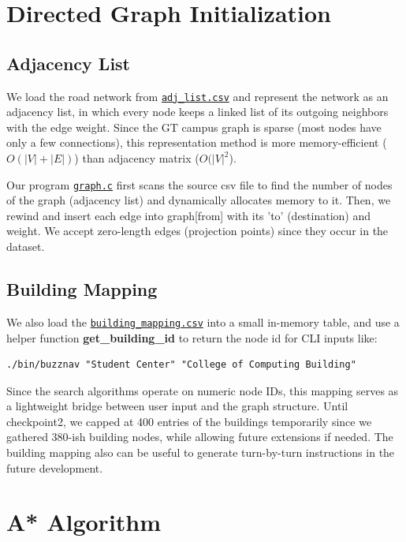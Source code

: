 \documentclass[fleqn,10pt]{olplainarticle}
\begin{document}
\section*{Directed Graph Initialization}
\subsection*{Adjacency List}
We load the road network from \href{https://github.com/fredkyang/cse6010-buzznav/blob/main/data/adj_list.csv}{\texttt{adj\_list.csv}} and represent the network as an adjacency list, in which every node keeps a linked list of its outgoing neighbors with the edge weight. Since the GT campus graph is sparse (most nodes have only a few connections), this representation method is more memory-efficient ($O(|V|+|E|)$) than adjacency matrix ($O(|V|^2$).

Our program \href{https://github.com/fredkyang/cse6010-buzznav/blob/main/src/graph.c}{\texttt{graph.c}} first scans the source csv file to find the number of nodes of the graph (adjacency list) and dynamically allocates memory to it. Then, we rewind and insert each edge into graph[from] with its 'to' (destination) and weight. We accept zero-length edges (projection points) since they occur in the dataset.

\subsection*{Building Mapping}
We also load the \href{https://github.com/fredkyang/cse6010-buzznav/blob/main/data/building_mapping.csv}{\texttt{building\_mapping.csv}} into a small in-memory table, and use a helper function \textbf{get\_building\_id} to return the node id for CLI inputs like:
\begin{lstlisting}
./bin/buzznav "Student Center" "College of Computing Building"
\end{lstlisting}
Since the search algorithms operate on numeric node IDs, this mapping serves as a lightweight bridge between user input and the graph structure. Until checkpoint2, we capped at 400 entries of the buildings temporarily since we gathered 380-ish building nodes, while allowing future extensions if needed. The building mapping also can be useful to generate turn-by-turn instructions in the future development.

\section*{A* Algorithm}
\end{document}
